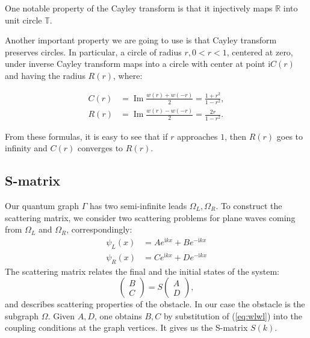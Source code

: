 \documentclass{birkjour}
\theoremstyle{definition}
\theoremstyle{remark}
\numberwithin{equation}{section}
\begin{document}
One notable property of the Cayley transform  is that it
injectively maps $\mathbb{R}$ into unit circle $\mathbb{T}$.

Another important property  we are going to use is that Cayley
transform preserves circles. In particular, a circle of radius $r,
0 < r < 1$, centered at zero, under inverse Cayley transform maps
into a circle with center at point $\mathrm{i} C(r)$ and having
the radius $R(r)$, where:

\begin{equation}\label{eq:c_and_r}
\begin{aligned}
   C(r) &= \operatorname{Im} \frac{w(r) + w(-r)}{2} =
   \frac{1 + r^2}{1 - r^2},
\\ R(r) &= \operatorname{Im} \frac{w(r) - w(-r)}{2} =
\frac{2 r}{1 - r^2}.
\end{aligned}
\end{equation}

From these formulas,  it is easy to see that if $r$ approaches
$1$, then $R(r)$ goes to infinity and $C(r)$ converges to $R(r)$.

\subsection{S-matrix}\label{sec:smatrix}
Our quantum graph $\Gamma$ has two semi-infinite leads
$\Omega_L,\Omega_R$. To construct the scattering matrix, we
consider two scattering problems for plane waves coming from
$\Omega_L$ and $\Omega_R$, correspondingly:
\begin{equation}\label{eq:wlwl}
\begin{aligned}
   \psi_L(x) &= A e^{\mathrm{i} k x} + B e^{-\mathrm{i} k x}
\\ \psi_R(x) &= C e^{\mathrm{i} k x} + D e^{-\mathrm{i} k x}
\end{aligned}
\end{equation}
The scattering matrix relates the final and the initial states of
the system:
\begin{equation}\label{eq:smatrix}
\begin{pmatrix} B \\ C \end{pmatrix} = S \begin{pmatrix} A \\
D \end{pmatrix},
\end{equation}
and describes scattering properties of the obstacle. In our case
the obstacle is the subgraph $\Omega$. Given $A,D$, one obtains
$B,C$ by substitution of (\ref{eq:wlwl}) into the coupling
conditions at the graph vertices. It
gives us the S-matrix $S(k)$.
\end{document}

